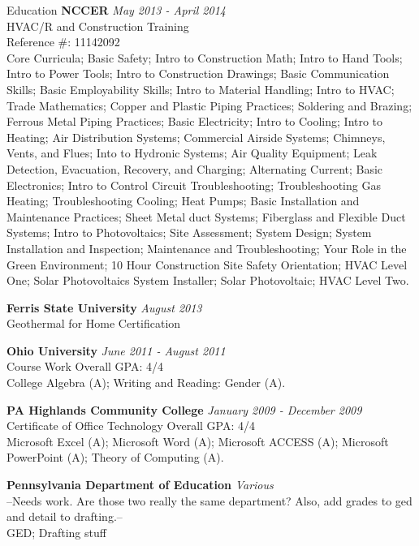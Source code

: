\documentclass{resume} %
\begin{document}
\begin{rSection}{Education}
{\bf NCCER} \hfill {\em May 2013 - April 2014} 
\\ HVAC/R and Construction Training \hfill {}
\\ Reference \#: 11142092
\smallskip \\
Core Curricula; Basic Safety; Intro to Construction Math; Intro to Hand Tools; Intro to Power Tools; Intro to Construction Drawings; Basic Communication Skills; Basic Employability Skills; Intro to Material Handling; Intro to HVAC; Trade Mathematics; Copper and Plastic Piping Practices; Soldering and Brazing; Ferrous Metal Piping Practices; Basic Electricity; Intro to Cooling; Intro to Heating; Air Distribution Systems; Commercial Airside Systems; Chimneys, Vents, and Flues; Into to Hydronic Systems; Air Quality Equipment; Leak Detection, Evacuation, Recovery, and Charging; Alternating Current; Basic Electronics; Intro to Control Circuit Troubleshooting; Troubleshooting Gas Heating; Troubleshooting Cooling; Heat Pumps; Basic Installation and Maintenance Practices; Sheet Metal duct Systems; Fiberglass and Flexible Duct Systems; Intro to Photovoltaics; Site Assessment; System Design; System Installation and Inspection; Maintenance and Troubleshooting; Your Role in the Green Environment; 10 Hour Construction Site Safety Orientation; HVAC Level One; Solar Photovoltaics System Installer; Solar Photovoltaic; HVAC Level Two.


{\bf Ferris State University} \hfill {\em August 2013} 
\\ Geothermal for Home Certification \hfill {}


{\bf Ohio University} \hfill {\em June 2011 - August 2011} 
\\ Course Work \hfill { Overall GPA: 4/4}
\smallskip \\
College Algebra (A); Writing and Reading: Gender (A).

{\bf PA Highlands Community College} \hfill {\em January 2009 - December 2009} 
\\ Certificate of Office Technology \hfill { Overall GPA: 4/4}
\smallskip \\
Microsoft Excel (A); Microsoft Word (A); Microsoft ACCESS (A); Microsoft PowerPoint (A); Theory of Computing (A).

{\bf Pennsylvania Department of Education} \hfill {\em Various} 
\\ --Needs work. Are those two really the same department? Also, add grades to ged and detail to drafting.-- \hfill {}
\smallskip \\
GED; Drafting stuff

\end{rSection}
\end{document}

